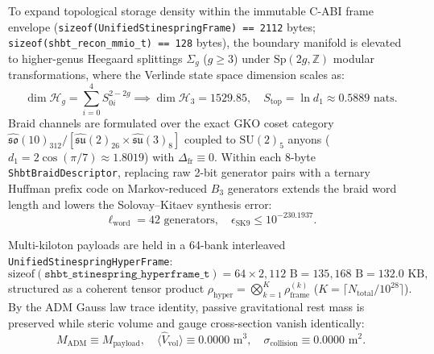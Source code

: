 \documentclass[11pt,onecolumn]{article}
\begin{document}
To expand topological storage density within the immutable C-ABI frame envelope (\texttt{sizeof(Unified}\allowbreak\texttt{Stinespring}\allowbreak\texttt{Frame) == 2112} bytes; \texttt{sizeof(shbt\_}\allowbreak\texttt{recon\_mmio\_t) == 128} bytes), the boundary manifold is elevated to higher-genus Heegaard splittings $\Sigma_g$ ($g \ge 3$) under $\mathrm{Sp}(2g, \mathbb{Z})$ modular transformations, where the Verlinde state space dimension scales as:
\begin{equation}
\label{eq:heegaard_dim}
  \dim\mathcal{H}_g = \sum_{i=0}^4 S_{0i}^{2-2g} \implies \dim\mathcal{H}_3 = 1529.85, \quad S_{\text{top}} = \ln d_1 \approx 0.5889\text{ nats}.
\end{equation}
Braid channels are formulated over the exact GKO coset category $\widehat{\mathfrak{so}}(10)_{312} / [\widehat{\mathfrak{su}}(2)_{26} \times \widehat{\mathfrak{su}}(3)_8]$ coupled to $\mathrm{SU}(2)_5$ anyons ($d_1 = 2\cos(\pi/7) \approx 1.8019$) with $\Delta_{\text{fr}} \equiv 0$. Within each 8-byte \texttt{ShbtBraidDescriptor}, replacing raw 2-bit generator pairs with a ternary Huffman prefix code on Markov-reduced $B_3$ generators extends the braid word length and lowers the Solovay--Kitaev synthesis error:
\begin{equation}
\label{eq:huffman_eff}
  \ell_{\text{word}} = 42\text{ generators}, \quad \epsilon_{\text{SK9}} \le 10^{-230.1937}.
\end{equation}

Multi-kiloton payloads are held in a 64-bank interleaved \texttt{UnifiedStinespringHyperFrame}:
\begin{equation}
\label{eq:hyperframe_layout}
  \text{sizeof}(\texttt{shbt\_stinespring\_hyperframe\_t}) = 64 \times 2{,}112\text{ B} = 135{,}168\text{ B} = 132.0\text{ KB},
\end{equation}
structured as a coherent tensor product $\rho_{\text{hyper}} = \bigotimes_{k=1}^K \rho_{\text{frame}}^{(k)}$ ($K = \lceil N_{\text{total}}/10^{28} \rceil$). By the ADM Gauss law trace identity, passive gravitational rest mass is preserved while steric volume and gauge cross-section vanish identically:
\begin{equation}
\label{eq:hyperframe_adm}
  M_{\text{ADM}} \equiv M_{\text{payload}}, \quad \langle\hat{V}_{\text{vol}}\rangle \equiv 0.0000\text{ m}^3, \quad \sigma_{\text{collision}} \equiv 0.0000\text{ m}^2.
\end{equation}
\end{document}
